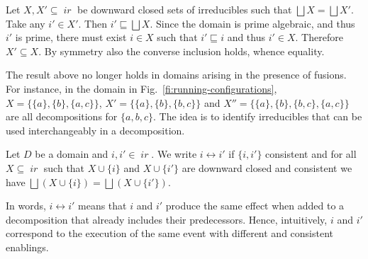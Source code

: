 \documentclass[conference]{IEEEtran}
\renewenvironment{proof}{\begin{IEEEproof}}{\end{IEEEproof}}
\newcommand{\ir}[1]{\ensuremath{\mathop{\mathit{ir}({#1})}}}
\begin{document}
\begin{proof}
  Let $X, X' \subseteq \ir{D}$ be downward closed sets of irreducibles
  such that $\bigsqcup X = \bigsqcup X'$.  Take any $i' \in X'$. Then
  $i' \sqsubseteq \bigsqcup X$. Since the domain is prime
  algebraic, and thus $i'$ is prime, there must exist $i \in X$ such
  that $i' \sqsubseteq i$ and thus $i' \in X$.  Therefore
  $X' \subseteq X$. By symmetry also the converse inclusion holds,
  whence equality.
\end{proof}



The result above no longer holds in domains arising in the presence
of fusions.  For instance, in the domain in
Fig.~\ref{fi:running-configurations},
$X = \{ \{a\}, \{b\}, \{a,c\} \}$, $X'= \{ \{a\}, \{b\}, \{b,c\} \}$
and $X''= \{ \{a\}, \{b\}, \{b,c\}, \{a,c\} \}$ are all decompositions
for $\{a,b,c\}$.
%
The idea is to identify irreducibles
that can be used interchangeably in a decomposition.


\begin{definition}[interchangeability]
  \label{de:interchangeable}
  Let $D$ be a domain and $i, i' \in \ir{D}$. We write
  $i \leftrightarrow i'$ if $\{i, i'\}$ consistent and for all
  $X \subseteq \ir{D}$ such that $X \cup \{ i \}$ and
  $ X \cup \{ i' \}$ are downward closed and consistent we have
  $\bigsqcup (X \cup \{ i \}) = \bigsqcup (X \cup \{ i' \})$.
\end{definition}

In words, $i \leftrightarrow i'$ means that $i$ and $i'$ produce the
same effect when added to a decomposition that already includes their
predecessors.
%
Hence, intuitively, $i$ and $i'$ correspond to the execution of the
same event with different and consistent enablings.
\end{document}
